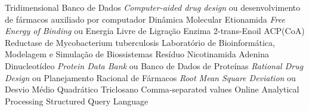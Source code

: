 \documentclass[portuguese,twoside]{pucrs-ppgcc}
\begin{document}
\begin{abstract}{lorem, ipsum, dolor, sit, amet}
Your abstract in English here. lorem ipsum dolor sit amet
consetetur sadipscing elitr sed diam nonumy eirmod tempor invidunt
ut labore et dolore magna aliquyam erat sed diam voluptua at vero
eos et accusam et justo duo dolores et ea rebum stet clita kasd
gubergren no sea takimata sanctus est lorem ipsum dolor sit amet
lorem ipsum dolor sit amet consetetur sadipscing elitr sed diam
nonumy eirmod tempor invidunt ut labore et dolore magna aliquyam
erat sed diam voluptua at
\end{abstract}

\listoffigures       %
\listoftables        %
\listofacronyms      %
\tableofcontents     %


		{Tridimensional}
		{Banco de Dados}
	{\emph{Computer-aided drug design} ou desenvolvimento de fármacos auxiliado por computador}
		{Dinâmica Molecular}
		{Etionamida}
		{\emph{Free Energy of Binding} ou Energia Livre de Ligração}
	{Enzima 2-trans-Enoil ACP(CoA) Reductase de Mycobacterium tuberculosis }
	{Laboratório de Bioinformática, Modelagem e Simulação de Biossistemas}
	{Resíduo Nicotinamida Adenina Dinucleotídeo}
		{\emph{Protein Data Bank} ou Banco de Dados de Proteínas}
		{\emph{Rational Drug Design} ou Planejamento Racional de Fármacos}
	{\emph{Root Mean Square Deviation} ou Desvio Médio Quadrático}
 	{Triclosano}
 	{Comma-separated values}
 	{Online Analytical Processing}
 	{Structured Query Language}










\end{document}
